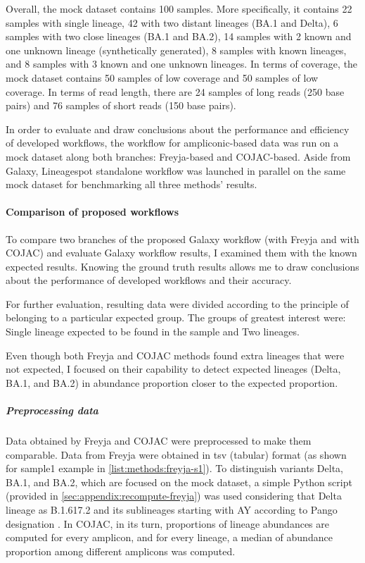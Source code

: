             Overall, the mock dataset contains 100 samples. More specifically, it contains 22 samples with single lineage, 42 with two distant lineages (BA.1 and Delta), 6 samples with two close lineages (BA.1 and BA.2), 14 samples with 2 known and one unknown lineage (synthetically generated), 8 samples with known lineages, and 8 samples with 3 known and one unknown lineages. In terms of coverage, the mock dataset contains 50 samples of low coverage and 50 samples of low coverage. In terms of read length, there are 24 samples of long reads (250 base pairs) and 76 samples of short reads (150 base pairs).
            
            In order to evaluate and draw conclusions about the performance and efficiency of developed workflows, the workflow for ampliconic-based data was run on a mock dataset along both branches: Freyja-based and COJAC-based. Aside from Galaxy, Lineagespot standalone workflow was launched in parallel on the same mock dataset for benchmarking all three methods' results.
            
            \paragraph{Comparison of proposed workflows} 
            To compare two branches of the proposed Galaxy workflow (with Freyja and with COJAC) and evaluate Galaxy workflow results, I examined them with the known expected results. Knowing the ground truth results allows me to draw conclusions about the performance of developed workflows and their accuracy. 
            
            For further evaluation, resulting data were divided according to the principle of belonging to a particular expected group. The groups of greatest interest were: Single lineage expected to be found in the sample and Two lineages.
            
            Even though both Freyja and COJAC methods found extra lineages that were not expected, I focused on their capability to detect expected lineages (Delta, BA.1, and BA.2) in abundance proportion closer to the expected proportion.

            
                \subparagraph{Preprocessing data} 
                Data obtained by Freyja and COJAC were preprocessed to make them comparable. Data from Freyja were obtained in \acrshort{tsv} (tabular) format (as shown for sample1 example in \cref{list:methods:freyja-s1}). To distinguish variants Delta, BA.1, and BA.2, which are focused on the mock dataset, a simple Python script (provided in \cref{sec:appendix:recompute-freyja}) was used considering that Delta lineage as B.1.617.2 and its sublineages starting with AY according to Pango designation \cite{otoole2021,covlineages}. In COJAC, in its turn, proportions of lineage abundances are computed for every amplicon, and for every lineage, a median of abundance proportion among different amplicons was computed.
                
